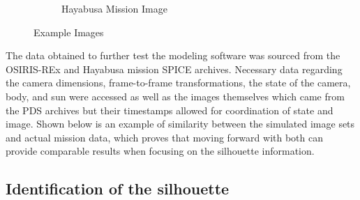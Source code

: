 \begin{figure}
\begin{subfigure}{0.23\textwidth}
         \caption{Hayabusa Mission Image}
         \label{fig:three sin x}
     \end{subfigure}
        \caption{Example Images}
        \label{fig:four_images}
\end{figure}
The data obtained to further test the modeling software was sourced from the OSIRIS-REx and Hayabusa mission SPICE archives. Necessary data regarding the camera dimensions, frame-to-frame transformations, the state of the camera, body, and sun were accessed as well as the images themselves which came from the PDS archives but their timestamps allowed for coordination of state and image. Shown below is an example of similarity between the simulated image sets and actual mission data, which proves that moving forward with both can provide comparable results when focusing on the silhouette information.



\subsection{Identification of the silhouette}

